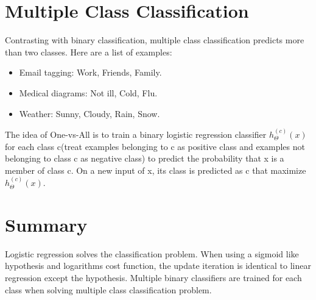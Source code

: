 \documentclass{article}
\begin{document}
\section{Multiple Class Classification}
Contrasting with binary classification, multiple class classification predicts more than two classes. Here are a list of examples:
\begin{itemize}
\item Email tagging: Work, Friends, Family.
\item Medical diagrams: Not ill, Cold, Flu.
\item Weather: Sunny, Cloudy, Rain, Snow.
\end{itemize}
The idea of One-vs-All is to train a binary logistic regression classifier $h_{\Theta}^{(c)}(x)$ for each class c(treat examples belonging to c as positive class and examples not belonging to class c as negative class) to predict the probability that x is a member of class c. On a new input of x, its class is predicted as c that maximize $h_{\Theta}^{(c)}(x)$.

\section{Summary}
Logistic regression solves the classification problem. When using a sigmoid like hypothesis and logarithms cost function, the update iteration is identical to linear regression except the hypothesis. Multiple binary classifiers are trained for each class when solving multiple class classification problem.
\end{document}
